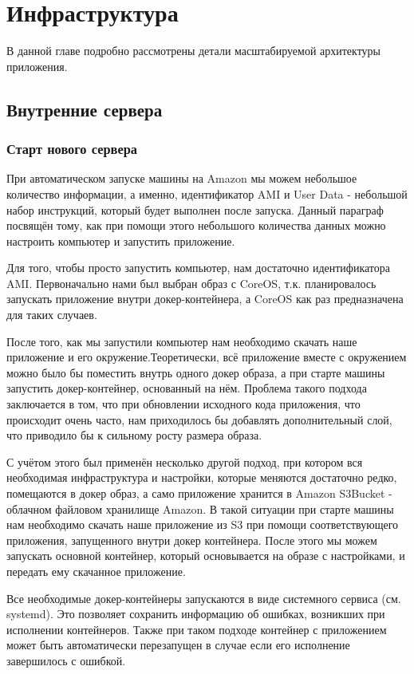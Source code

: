 
\chapter{Инфраструктура}
\label{ch:infrastructure}

В данной главе подробно рассмотрены детали масштабируемой архитектуры приложения.

\section{Внутренние сервера}
\subsection{Старт нового сервера}
	При автоматическом запуске машины на Amazon мы можем небольшое количество информации, а именно, идентификатор AMI и User Data - небольшой набор инструкций, который будет выполнен после запуска. Данный параграф посвящён тому, как при помощи этого небольшого количества данных можно настроить компьютер и запустить приложение.
	
	Для того, чтобы просто запустить компьютер, нам достаточно идентификатора AMI. Первоначально нами был выбран образ с CoreOS, т.к. планировалось запускать приложение внутри докер-контейнера, а CoreOS как раз предназначена для таких случаев.
	
	После того, как мы запустили компьютер нам необходимо скачать наше приложение и его окружение.Теоретически, всё приложение вместе с окружением можно было бы поместить внутрь одного докер образа, а при старте машины запустить докер-контейнер, основанный на нём. Проблема такого подхода заключается в том, что при обновлении исходного кода приложения, что происходит очень часто, нам приходилось бы добавлять дополнительный слой, что приводило бы к сильному росту размера образа.
	
	С учётом этого был применён несколько другой подход, при котором вся необходимая инфраструктура и настройки, которые меняются достаточно редко, помещаются в докер образ, а само приложение хранится в Amazon S3Bucket - облачном файловом хранилище Amazon. В такой ситуации при старте машины нам необходимо  скачать наше приложение из S3 при помощи соответствующего приложения, запущенного внутри докер контейнера. После этого мы можем запускать основной контейнер, который основывается на образе с настройками, и передать ему скачанное приложение.
	
	Все необходимые докер-контейнеры запускаются в виде системного сервиса (см. systemd). Это позволяет сохранить информацию об ошибках, возникших при исполнении контейнеров. Также при таком подходе контейнер с приложением может быть автоматически перезапущен в случае если его исполнение завершилось с ошибкой.
	

